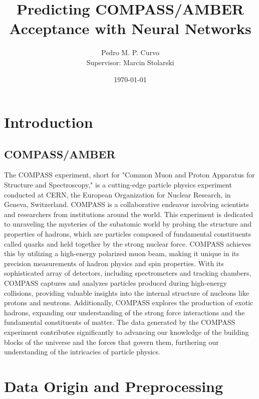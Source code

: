 \documentclass{article}
\title{Predicting COMPASS/AMBER Acceptance with Neural Networks}
\author{Pedro M. P. Curvo \\ Supervisor: Marcin Stolarski}
\date{\today}
\begin{document}
\maketitle

\begin{abstract}
\end{abstract}

\section{Introduction}

\subsection{COMPASS/AMBER}

The COMPASS experiment, short for "Common Muon and Proton Apparatus for Structure 
and Spectroscopy," is a cutting-edge particle physics experiment conducted at CERN, 
the European Organization for Nuclear Research, in Geneva, Switzerland. COMPASS is a 
collaborative endeavor involving scientists and researchers from institutions around the world.
This experiment is dedicated to unraveling the mysteries of the subatomic world by probing the 
structure and properties of hadrons, which are particles composed of fundamental constituents 
called quarks and held together by the strong nuclear force. COMPASS achieves this by utilizing 
a high-energy polarized muon beam, making it unique in its precision measurements of hadron 
physics and spin properties.
With its sophisticated array of detectors, including spectrometers and tracking chambers, 
COMPASS captures and analyzes particles produced during high-energy collisions, providing 
valuable insights into the internal structure of nucleons like protons and neutrons. 
Additionally, COMPASS explores the production of exotic hadrons, expanding our understanding 
of the strong force interactions and the fundamental constituents of matter.
The data generated by the COMPASS experiment contributes significantly to advancing our 
knowledge of the building blocks of the universe and the forces that govern them, 
furthering our understanding of the intricacies of particle physics.


\section{Data Origin and Preprocessing}
\end{document}
